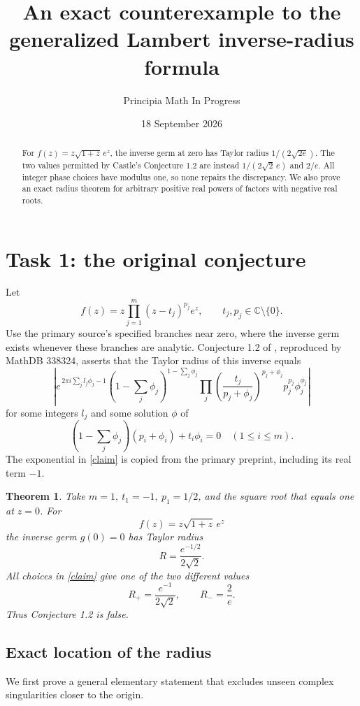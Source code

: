 \documentclass[11pt]{article}
\title{An exact counterexample to the generalized Lambert inverse-radius formula}
\author{Principia Math In Progress}
\date{18 September 2026}
\newtheorem{theorem}{Theorem}
\begin{document}
\maketitle
\begin{abstract}
For \(f(z)=z\sqrt{1+z}\,e^z\), the inverse germ at zero has Taylor
radius \(1/(2\sqrt{2e})\). The two values permitted by Castle's
Conjecture 1.2 are instead \(1/(2\sqrt2\,e)\) and \(2/e\).
All integer phase choices have modulus one, so none repairs the
discrepancy. We also prove an exact radius theorem for arbitrary
positive real powers of factors with negative real roots.
\end{abstract}

\section*{Task 1: the original conjecture}
Let
\[
 f(z)=z\prod_{j=1}^m(z-t_j)^{p_j}e^z,\qquad
 t_j,p_j\in\mathbb C\setminus\{0\}.
\]
Use the primary source's specified branches near zero, where the
inverse germ exists whenever these branches are analytic.
Conjecture 1.2 of \cite[p.~3]{Castle}, reproduced by MathDB 338324,
asserts that the Taylor radius of this inverse equals
\begin{equation}\label{claim}
 \left|
 e^{\,2\pi i\sum_j l_j\phi_j-1}
 \left(1-\sum_j\phi_j\right)^{1-\sum_j\phi_j}
 \prod_j
 \left(\frac{t_j}{p_j+\phi_j}\right)^{p_j+\phi_j}
 p_j^{p_j}\phi_j^{\phi_j}
 \right|
\end{equation}
for some integers \(l_j\) and some solution \(\phi\) of
\begin{equation}\label{saddles}
 \left(1-\sum_j\phi_j\right)(p_i+\phi_i)+t_i\phi_i=0
 \quad(1\le i\le m).
\end{equation}
The exponential in \eqref{claim} is copied from the primary
preprint, including its real term \(-1\).

\begin{theorem}\label{counter}
Take \(m=1,\ t_1=-1,\ p_1=1/2\), and the square root that equals
one at \(z=0\). For
\[
 f(z)=z\sqrt{1+z}\,e^z
\]
the inverse germ \(g(0)=0\) has Taylor radius
\[
 R=\frac{e^{-1/2}}{2\sqrt2}.
\]
All choices in \eqref{claim} give one of the two different values
\[
 R_+=\frac{e^{-1}}{2\sqrt2},\qquad R_-=\frac2e.
\]
Thus Conjecture 1.2 is false.
\end{theorem}

\subsection*{Exact location of the radius}
We first prove a general elementary statement that excludes
unseen complex singularities closer to the origin.
\end{document}
